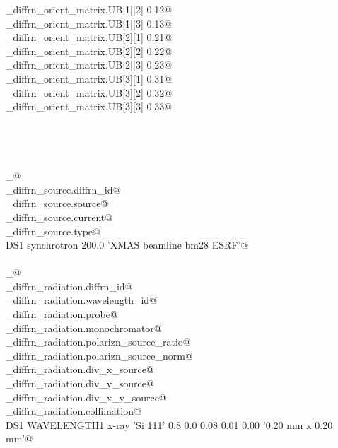 \documentclass[10pt,a4paper,twoside,notitlepage]{article}
\begin{document}
\begin{flushleft}
\begin{list}{}{}
\mbox{}\verb@_diffrn_orient_matrix.UB[1][2]            0.12@\\
\mbox{}\verb@_diffrn_orient_matrix.UB[1][3]            0.13@\\
\mbox{}\verb@_diffrn_orient_matrix.UB[2][1]            0.21@\\
\mbox{}\verb@_diffrn_orient_matrix.UB[2][2]            0.22@\\
\mbox{}\verb@_diffrn_orient_matrix.UB[2][3]            0.23@\\
\mbox{}\verb@_diffrn_orient_matrix.UB[3][1]            0.31@\\
\mbox{}\verb@_diffrn_orient_matrix.UB[3][2]            0.32@\\
\mbox{}\verb@_diffrn_orient_matrix.UB[3][3]            0.33@\\
\mbox{}\verb@@\\
\mbox{}\verb@@\\
\mbox{}\verb@@\\
\mbox{}\verb@@\\
\mbox{}\verb@loop_@\\
\mbox{}\verb@_diffrn_source.diffrn_id@\\
\mbox{}\verb@_diffrn_source.source@\\
\mbox{}\verb@_diffrn_source.current@\\
\mbox{}\verb@_diffrn_source.type@\\
\mbox{}\verb@ DS1 synchrotron 200.0 'XMAS beamline bm28 ESRF'@\\
\mbox{}\verb@@\\
\mbox{}\verb@loop_@\\
\mbox{}\verb@_diffrn_radiation.diffrn_id@\\
\mbox{}\verb@_diffrn_radiation.wavelength_id@\\
\mbox{}\verb@_diffrn_radiation.probe@\\
\mbox{}\verb@_diffrn_radiation.monochromator@\\
\mbox{}\verb@_diffrn_radiation.polarizn_source_ratio@\\
\mbox{}\verb@_diffrn_radiation.polarizn_source_norm@\\
\mbox{}\verb@_diffrn_radiation.div_x_source@\\
\mbox{}\verb@_diffrn_radiation.div_y_source@\\
\mbox{}\verb@_diffrn_radiation.div_x_y_source@\\
\mbox{}\verb@_diffrn_radiation.collimation@\\
\mbox{}\verb@ DS1 WAVELENGTH1 x-ray 'Si 111' 0.8 0.0 0.08 0.01 0.00 '0.20 mm x 0.20 mm'@\\

\end{list}
\end{flushleft}
\end{document}
